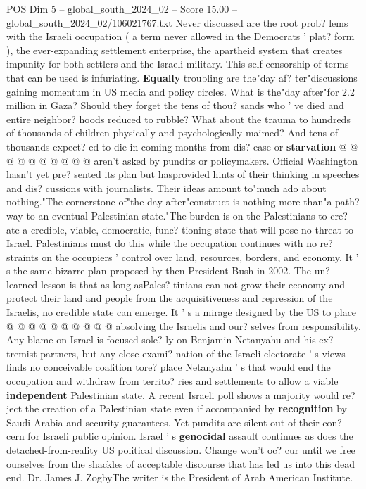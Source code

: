 \begin{textsample}{POS Dim 5 – global\_south\_2024\_02 – Score 15.00 – global\_south\_2024\_02/106021767.txt}
Never discussed are the root prob? lems with the Israeli occupation ( a term never allowed in the Democrats ' plat? form ), the ever-expanding settlement enterprise, the apartheid system that creates impunity for both settlers and the Israeli military.
This self-censorship of terms that can be used is infuriating. \textbf{Equally} troubling are the"day af? ter"discussions gaining momentum in US media and policy circles.
What is the"day after"for 2.2 million in Gaza?
Should they forget the tens of thou? sands who ' ve died and entire neighbor? hoods reduced to rubble?
What about the trauma to hundreds of thousands of children physically and psychologically maimed?
And tens of thousands expect? ed to die in coming months from dis? ease or \textbf{starvation} @ @ @ @ @ @ @ @ @ @ aren't asked by pundits or policymakers.
Official Washington hasn't yet pre? sented its plan but hasprovided hints of their thinking in speeches and dis? cussions with journalists.
Their ideas amount to"much ado about nothing."The cornerstone of"the day after"construct is nothing more than"a path? way to an eventual Palestinian state."The burden is on the Palestinians to cre? ate a credible, viable, democratic, func? tioning state that will pose no threat to Israel.
Palestinians must do this while the occupation continues with no re? straints on the occupiers ' control over land, resources, borders, and economy.
It ' s the same bizarre plan proposed by then President Bush in 2002.
The un? learned lesson is that as long asPales? tinians can not grow their economy and protect their land and people from the acquisitiveness and repression of the Israelis, no credible state can emerge.
It ' s a mirage designed by the US to place @ @ @ @ @ @ @ @ @ @ absolving the Israelis and our? selves from responsibility.
Any blame on Israel is focused sole? ly on Benjamin Netanyahu and his ex? tremist partners, but any close exami? nation of the Israeli electorate ' s views finds no conceivable coalition tore? place Netanyahu ' s that would end the occupation and withdraw from territo? ries and settlements to allow a viable \textbf{independent} Palestinian state.
A recent Israeli poll shows a majority would re? ject the creation of a Palestinian state even if accompanied by \textbf{recognition} by Saudi Arabia and security guarantees.
Yet pundits are silent out of their con? cern for Israeli public opinion.
Israel ' s \textbf{genocidal} assault continues as does the detached-from-reality US political discussion.
Change won't oc? cur until we free ourselves from the shackles of acceptable discourse that has led us into this dead end.
Dr.
James J.
ZogbyThe writer is the President of Arab American Institute.

\end{textsample}
